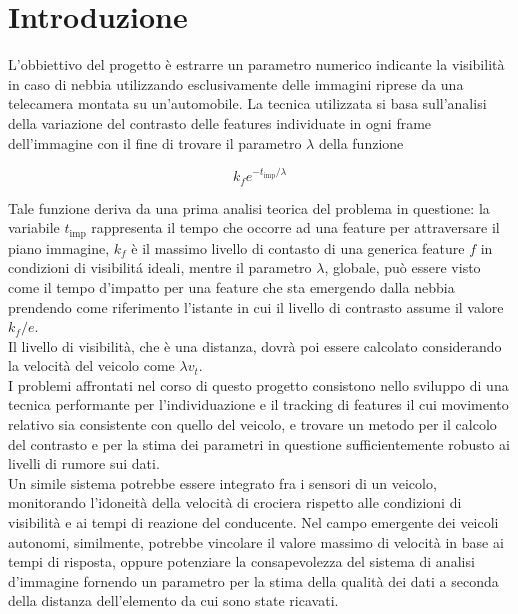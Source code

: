 \documentclass[12pt]{report}
\begin{document}

\tableofcontents

\chapter{Introduzione}

L'obbiettivo del progetto \`e estrarre un parametro numerico indicante la visibilit\`a in caso di nebbia utilizzando esclusivamente delle immagini riprese da una telecamera montata su un'automobile. La tecnica utilizzata si basa sull'analisi della variazione del contrasto delle features individuate in ogni frame dell'immagine con il fine di trovare il parametro $\lambda$ della funzione

$$k_fe^{-t_{\text{imp}}/\lambda}$$

\noindent Tale funzione deriva da una prima analisi teorica del problema in questione: la variabile $t_{\text{imp}}$ rappresenta il tempo che occorre ad una feature per attraversare il piano immagine, $k_f$ \`e il massimo livello di contasto di una generica feature $f$ in condizioni di visibilit\'a ideali, mentre il parametro $\lambda$, globale, pu\`o essere visto come il tempo d'impatto per una feature che sta emergendo dalla nebbia prendendo come riferimento l'istante in cui il livello di contrasto assume il valore $k_f/e$.\\
\noindent Il livello di visibilit\`a, che \`e una distanza, dovr\`a poi essere calcolato considerando la velocit\`a del veicolo come $\lambda v_t$.\\

\noindent I problemi affrontati nel corso di questo progetto consistono nello sviluppo di una tecnica performante per l'individuazione e il tracking di features il cui movimento relativo sia consistente con quello del veicolo, e trovare un metodo per il calcolo del contrasto e per la stima dei parametri in questione sufficientemente robusto ai livelli di rumore sui dati.\\
	 	
\noindent Un simile sistema potrebbe essere integrato fra i sensori di un veicolo, monitorando l'idoneit\`a della velocit\`a di crociera rispetto alle condizioni di visibilit\`a e ai tempi di reazione del conducente. Nel campo emergente dei veicoli autonomi, similmente, potrebbe vincolare il valore massimo di velocit\`a in base ai tempi di risposta, oppure potenziare la consapevolezza del sistema di analisi d'immagine fornendo un parametro per la stima della qualit\`a dei dati a seconda della distanza dell'elemento da cui sono state ricavati.
\end{document}

